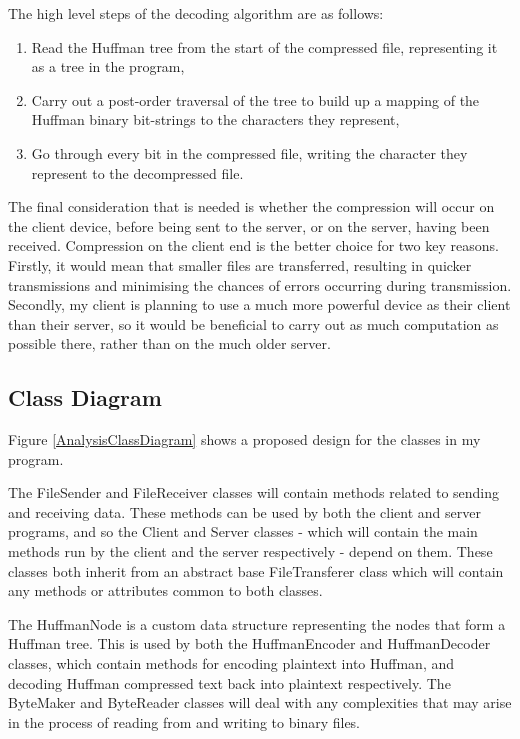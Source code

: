 \documentclass[../main.tex]{subfiles}
\begin{document}
The high level steps of the decoding algorithm are as follows:
\begin{enumerate}
    \item Read the Huffman tree from the start of the compressed file, representing it as a tree in the program,
    \item Carry out a post-order traversal of the tree to build up a mapping of the Huffman binary bit-strings to the characters they represent,
    \item Go through every bit in the compressed file, writing the character they represent to the decompressed file.
\end{enumerate}

The final consideration that is needed is whether the compression will occur on the client device, before being sent to the server, or on the server, having been received. Compression on the client end is the better choice for two key reasons. Firstly, it would mean that smaller files are transferred, resulting in quicker transmissions and minimising the chances of errors occurring during transmission. Secondly, my client is planning to use a much more powerful device as their client than their server, so it would be beneficial to carry out as much computation as possible there, rather than on the much older server.

\subsection{Class Diagram}

Figure \ref{AnalysisClassDiagram} shows a proposed design for the classes in my program.

The FileSender and FileReceiver classes will contain methods related to sending and receiving data. These methods can be used by both the client and server programs, and so the Client and Server classes - which will contain the main methods run by the client and the server respectively - depend on them. These classes both inherit from an abstract base FileTransferer class which will contain any methods or attributes common to both classes.

The HuffmanNode is a custom data structure representing the nodes that form a Huffman tree. This is used by both the HuffmanEncoder and HuffmanDecoder classes, which contain methods for encoding plaintext into Huffman, and decoding Huffman compressed text back into plaintext respectively. The ByteMaker and ByteReader classes will deal with any complexities that may arise in the process of reading from and writing to binary files.
\end{document}
